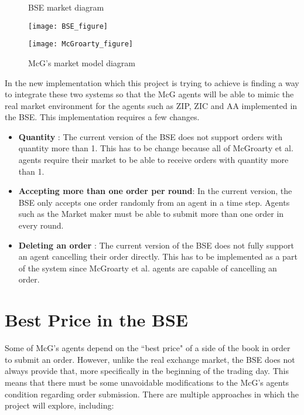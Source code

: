 \begin{figure}[h]
\caption{BSE market diagram} 
\texttt{[image: BSE\_figure]}
\caption{McG's market model diagram} 
\texttt{[image: McGroarty\_figure]}
\end{figure} 
\FloatBarrier

In the new implementation which this project is trying to achieve is finding a way to integrate these two systems so that the McG agents will be able to mimic the real market environment for the agents such as ZIP, ZIC and AA implemented in the BSE. This implementation requires a few changes.

\begin{itemize}
    \item  \textbf{Quantity} : The current version of the BSE does not support orders with quantity more than 1. This has to be change because all of McGroarty et al. agents require their market to be able to receive orders with quantity more than 1. 
    \item  \textbf{Accepting more than one order per round}: In the current version, the BSE only accepts one order randomly from an agent in a time step. Agents such as the Market maker must be able to submit more than one order in every round. 
    \item \textbf{Deleting an order} : The current version of the BSE does not fully support an agent cancelling their order directly. This has to be implemented as a part of the system since McGroarty et al. agents are capable of cancelling an order.
\end{itemize} 

\section{Best Price in the BSE}
Some of McG's agents depend on the ``best price" of a side of the book in order to submit an order. However, unlike the real exchange market, the BSE does not always provide that, more specifically in the beginning of the trading day. This means that there must be some unavoidable modifications to the McG's agents condition regarding order submission. There are multiple approaches in which the project will explore, including:

